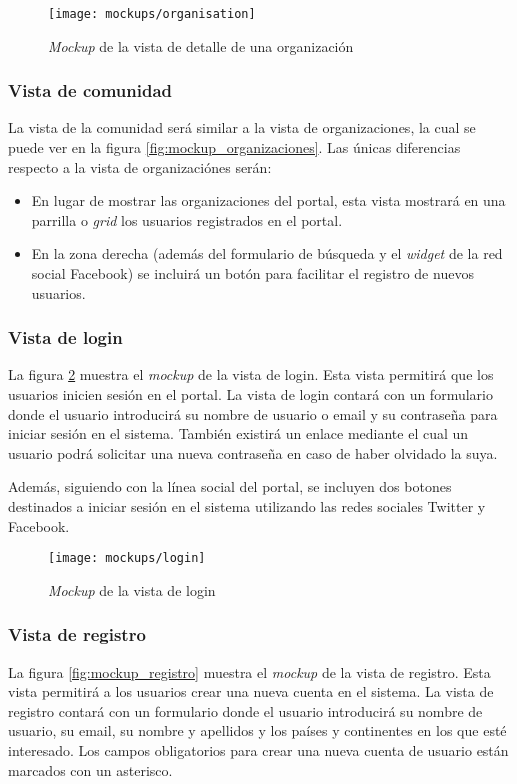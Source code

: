 \begin{figure}[h]
	\centering
	\texttt{[image: mockups/organisation]}
	\caption{\textit{Mockup} de la vista de detalle de una organización}
	\label{fig:mockup_organizacion}
\end{figure}


\subsubsection{Vista de comunidad}
La vista de la comunidad será similar a la vista de organizaciones, la cual se puede ver en la figura \ref{fig:mockup_organizaciones}.  Las únicas diferencias respecto a la vista de organizaciónes serán:
\begin{itemize}
	\item En lugar de mostrar las organizaciones del portal, esta vista mostrará en una parrilla o \textit{grid} los usuarios registrados en el portal.
	\item En la zona derecha (además del formulario de búsqueda y el \textit{widget} de la red social Facebook) se incluirá un botón para facilitar el registro de nuevos usuarios.
\end{itemize}

\subsubsection{Vista de login}
La figura \ref{fig:mockup_login} muestra el \textit{mockup} de la vista de login. Esta vista permitirá que los usuarios inicien sesión en el portal.  La vista de login contará con un formulario donde el usuario introducirá su nombre de usuario o email y su contraseña para iniciar sesión en el sistema.  También existirá un enlace mediante el cual un usuario podrá solicitar una nueva contraseña en caso de haber olvidado la suya.

Además, siguiendo con la línea social del portal, se incluyen dos botones destinados a iniciar sesión en el sistema utilizando las redes sociales Twitter y Facebook.

\begin{figure}[h]
	\centering
	\texttt{[image: mockups/login]}
	\caption{\textit{Mockup} de la vista de login}
	\label{fig:mockup_login}
\end{figure}


\subsubsection{Vista de registro}
La figura \ref{fig:mockup_registro} muestra el \textit{mockup} de la vista de registro. Esta vista permitirá a los usuarios crear una nueva cuenta en el sistema.  La vista de registro contará con un formulario donde el usuario introducirá su nombre de usuario, su email, su nombre y apellidos y los países y continentes en los que esté interesado. Los campos obligatorios para crear una nueva cuenta de usuario están marcados con un asterisco.  

